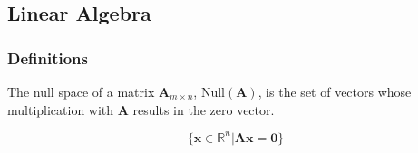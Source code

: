 







\newpage
\subsection{Linear Algebra}

\subsubsection{Definitions}

\begin{definition}
The null space of a matrix $\mathbf{A}_{m \times n}$, $\mathrm{Null}(\mathbf{A})$,  is the set of vectors whose multiplication with $\mathbf{A}$ results in the zero vector.

\begin{equation}
    \{ \mathbf{x} \in \mathbb{R}^n | \mathbf{A} \mathbf{x} = \mathbf{0} \}
\end{equation}

\end{definition}

